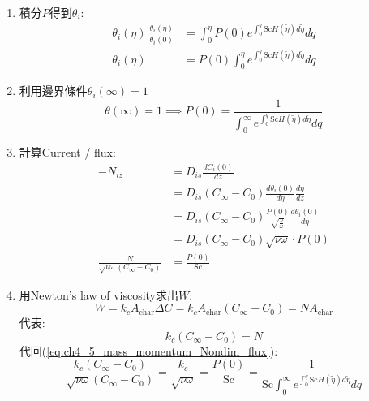 \documentclass[../main.tex]{subfiles}
\begin{document}
\begin{itemize}
\begin{enumerate}
\begin{align}
      P(\eta) = P(0) e^{\int_0^\eta \text{Sc}H(\tilde \eta)d\tilde\eta}
    \end{align}
    \item 積分$P$得到$\theta_i$:
    \begin{align}
      \theta_i(\eta)\bigg|_{\theta_i(0)}^{\theta_i(\eta)} &= \int_0^\eta P(0) 
      e^{\int_0^q \text{Sc}H(\tilde \eta)d\tilde\eta} dq\\
      \theta_i(\eta) &= P(0) \int_0^\eta e^{\int_0^q \text{Sc}H(\tilde \eta)d\tilde\eta} dq
    \end{align}
    \item 利用邊界條件$\theta_i(\infty)=1$
    \begin{equation}
      \theta(\infty) =1 \implies P(0) =\frac{1}{
        \int_0^\infty e^{\int_0^q \text{Sc}H(\tilde \eta)d\tilde\eta} dq
      }
    \end{equation}
    \item 計算Current / flux:
    \begin{align}
      -N_{iz} &= D_{is} \frac{dC_i(0)}{dz}\nonumber\\
      & = D_{is}\left(C_\infty - C_0\right) \frac{d\theta_i(0)}{d\eta}\frac{d\eta}{dz}\nonumber\\
      &= D_{is}\left(C_\infty - C_0\right) \frac{P(0)}{\sqrt{\frac{\nu}{\omega}}}\frac{d\theta_i(0)}{d\eta}\nonumber\\
      &= D_{is}\left(C_\infty - C_0\right)\sqrt{\nu\omega} \cdot P(0)\nonumber\\
      \frac{N}{\sqrt{\nu\omega}\left(C_\infty - C_0\right)} &=\frac{P(0)}{\text{Sc}} \label{eq:ch4_5_mass_momentum_Nondim_flux}
    \end{align}
    \item 用Newton's law of viscosity求出$W$:
    \begin{equation}
      W = k_cA_{\text{char}}\Delta C = k_c A_{\text{char}} (C_\infty - C_0) = N A_{\text{char}}
    \end{equation}
    代表:
    \begin{equation}
      k_c (C_\infty - C_0) = N
    \end{equation}
    代回(\ref{eq:ch4_5_mass_momentum_Nondim_flux}):
    \begin{equation}
      \frac{k_c (C_\infty - C_0)}{\sqrt{\nu\omega}(C_\infty - C_0)} = 
      \boxed{\frac{k_c}{\sqrt{\nu\omega}}} = \frac{P(0)}{\text{Sc}} 
      = \frac{1}{\text{Sc}\int_0^\infty e^{\int_0^q \text{Sc}H(\tilde \eta)d\tilde\eta} dq}
    \end{equation}

\end{enumerate}
\end{itemize}
\end{document}
